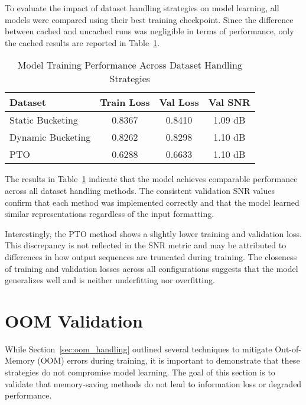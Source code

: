 To evaluate the impact of dataset handling strategies on model learning, all models were compared using their best training checkpoint. Since the difference between cached and uncached runs was negligible in terms of performance, only the cached results are reported in Table~\ref{tab:dataset_performance}.

\vspace{1em}
\begin{table}[H]
\centering
\caption{Model Training Performance Across Dataset Handling Strategies}
\label{tab:dataset_performance}
\begin{tabular}{|l|c|c|c|}
\hline
\textbf{Dataset} & \textbf{Train Loss} & \textbf{Val Loss} & \textbf{Val SNR} \\
\hline
Static Bucketing  & 0.8367  & 0.8410  & 1.09 dB \\
Dynamic Bucketing & 0.8262  & 0.8298  & 1.10 dB \\  
PTO               & 0.6288  & 0.6633  & 1.10 dB \\
\hline
\end{tabular}
\end{table}

The results in Table~\ref{tab:dataset_performance} indicate that the model achieves comparable performance across all dataset handling methods. The consistent validation SNR values confirm that each method was implemented correctly and that the model learned similar representations regardless of the input formatting.

Interestingly, the PTO method shows a slightly lower training and validation loss. This discrepancy is not reflected in the SNR metric and may be attributed to differences in how output sequences are truncated during training. The closeness of training and validation losses across all configurations suggests that the model generalizes well and is neither underfitting nor overfitting.


\section{OOM Validation}
\label{sec:oom_validation}

While Section~\ref{sec:oom_handling} outlined several techniques to mitigate Out-of-Memory (OOM) errors during training, it is important to demonstrate that these strategies do not compromise model learning. The goal of this section is to validate that memory-saving methods do not lead to information loss or degraded performance.

